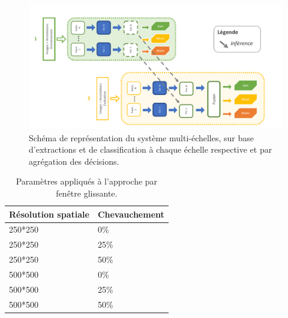 \begin{figure}[H]
    \centering
    \includegraphics[width=\linewidth]{contents/chapter_5/resources/scheme_sliding_features.pdf}
    \caption{Schéma de représentation du système multi-échelles, sur base d'extractions et de classification à chaque échelle respective et par agrégation des décisions.}
    \label{fig:scheme_sliding_features}
\end{figure}\par

\begin{table}[H]
    \centering
    \begin{tabular*}{0.6\linewidth}{l@{\extracolsep{\fill}}l}
    \toprule
    \textbf{Résolution spatiale}& \textbf{Chevauchement}   \\ \hline
    250*250                     & 0\%                      \\ \hline
    250*250                     & 25\%                     \\ \hline
    250*250                     & 50\%                     \\ \hline 
    500*500                     & 0\%                      \\ \hline
    500*500                     & 25\%                     \\ \hline
    500*500                     & 50\%                     \\
    \bottomrule
    \end{tabular*}
    \caption{Paramètres appliqués à l'approche par fenêtre glissante.}
    \label{tab:sliding_window_parameters}
\end{table}\par

